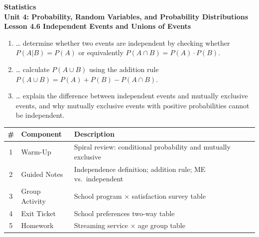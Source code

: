 \documentclass[10pt]{article}
\begin{document}
\vspace{-0.8in}

\begin{center}
  {\color{white}\textbf{\LARGE Statistics}}\\[4pt]
  {\color{skymid}\large\textbf{Unit 4: Probability, Random Variables, and Probability Distributions}}\\[6pt]
  {\color{white}\textbf{\large Lesson 4.6 \quad Independent Events and Unions of Events}}
\end{center}

\vspace{0.22in}
\namedateperiod
\vspace{0.18in}

\begin{learningtargetbox}
\small
\begin{enumerate}[leftmargin=1.5em, itemsep=5pt]
  \item \ldots{} determine whether two events are independent by checking whether
        $P(A|B) = P(A)$ or equivalently $P(A \cap B) = P(A) \cdot P(B)$.
  \item \ldots{} calculate $P(A \cup B)$ using the addition rule
        $P(A \cup B) = P(A) + P(B) - P(A \cap B)$.
  \item \ldots{} explain the difference between independent events and mutually
        exclusive events, and why mutually exclusive events with positive probabilities
        cannot be independent.
\end{enumerate}
\end{learningtargetbox}

\vspace{0.14in}

\begin{tocbox}
\small
\renewcommand{\arraystretch}{1.5}
\begin{tabularx}{\linewidth}{@{} c l X @{}}
\rowcolor{sky}
\textbf{\#} & \textbf{Component} & \textbf{Description} \\
\midrule
1 & Warm-Up        & Spiral review: conditional probability and mutually exclusive \\
2 & Guided Notes   & Independence definition; addition rule; ME vs.\ independent \\
3 & Group Activity & School program $\times$ satisfaction survey table \\
4 & Exit Ticket    & School preferences two-way table \\
5 & Homework       & Streaming service $\times$ age group table \\
\end{tabularx}
\end{tocbox}
\end{document}
